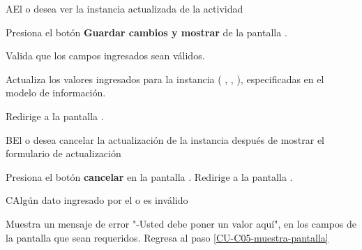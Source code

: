 \begin{UCtrayectoriaA}{A}{El  o  desea ver la instancia actualizada de la actividad}

    \Actor Presiona el botón {\bf Guardar cambios y mostrar} de la pantalla .

    \Sistema Valida que los campos ingresados sean válidos.  

    \Sistema Actualiza los valores ingresados para la instancia  (
      ,
      ,
      ), especificadas en el modelo de información.

    \Sistema Redirige a la pantalla .

\end{UCtrayectoriaA}

\begin{UCtrayectoriaA}%
  {B}{El  o  desea cancelar la actualización de la instancia después de mostrar el formulario de actualización}

  \Actor Presiona el botón {\bf cancelar} en la pantalla .
  \Sistema Redirige a la pantalla .

\end{UCtrayectoriaA}

\begin{UCtrayectoriaA}{C}{Algún dato ingresado por el  o  es inválido}

  \Sistema Muestra un mensaje de error "-Usted debe poner un valor aquí", en los campos de la pantalla  que sean requeridos.
  \Sistema Regresa al paso \ref{CU-C05-muestra-pantalla}

\end{UCtrayectoriaA}
